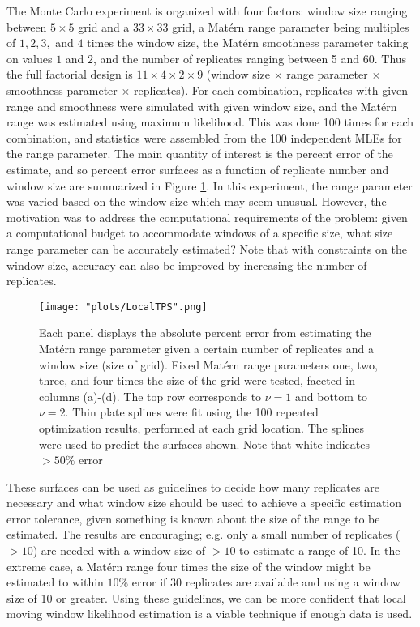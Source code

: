 \documentclass[review]{elsarticle}
\begin{document}
The Monte Carlo experiment is organized with four factors: window size ranging between  $5 \times 5$ grid and a $33 \times 33$ grid, a Mat\'ern range parameter being multiples of $1,2,3,$ and $4$ times the window size, the  Mat\'ern smoothness parameter taking on values $1$ and $2$, and the number of replicates ranging between 5 and 60.  Thus the full factorial design is $11 \times 4 \times 2 \times 9$ (window size $\times$ range parameter $\times$ smoothness parameter $\times$ replicates). 
For each combination, replicates with given range and smoothness were simulated with given window size, and the Mat\'ern range was estimated using maximum likelihood. This was done 100 times for each combination, and statistics were assembled from the 100 independent MLEs for the range parameter. The  main quantity of interest is the percent error of the estimate, and so percent error surfaces as a function of replicate number and window size are summarized in Figure \ref{f:2}.  In this experiment, the range parameter was varied based on the window size which may seem unusual.  However, the motivation was to address the computational requirements of the problem: given a computational budget to accommodate windows of a specific size, what size range parameter can be accurately estimated? Note that with constraints on the window size, accuracy can also be improved by increasing the number of replicates. 

\begin{figure}[h]
    \centering
   \texttt{[image: "plots/LocalTPS".png]}
    \caption{Each panel displays the absolute percent error from estimating the Mat\'ern range parameter given a certain number of replicates and a window size (size of grid). Fixed Mat\'ern range parameters one, two, three, and four times the size of the grid were tested, faceted in columns (a)-(d). The top row corresponds to $\nu=1$ and bottom to $\nu=2$. Thin plate splines were fit using the 100 repeated optimization results, performed at each grid location. The splines were used to predict the surfaces shown. Note that white indicates $>50\%$ error}
    \label{f:2}
\end{figure}

These surfaces can be used as guidelines to decide how many replicates are necessary and what window size should be used to achieve a specific estimation error tolerance, given something is known about the size of the range to be estimated. The results are encouraging; e.g. only a small number of replicates ($>10$) are needed with a window size of $>10$ to estimate a range of 10. In the extreme case, a Mat\'ern range four times the size of the window might be estimated to within $10\%$ error if 30 replicates are available and using a window size of 10 or greater. Using these guidelines, we can be more confident that local moving window likelihood estimation is a viable technique if enough data is used.
\end{document}
